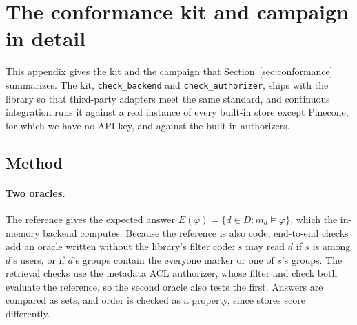 
\section{The conformance kit and campaign in detail}\label{app:conformance}

This appendix gives the kit and the campaign that Section~\ref{sec:conformance} summarizes. The kit,
\texttt{check\_backend} and \texttt{check\_authorizer}, ships with the library so that third-party adapters meet the
same standard, and continuous integration runs it against a real instance of every built-in store except Pinecone,
for which we have no API key, and against the built-in authorizers.

\subsection{Method}\label{sec:conf-method}

\paragraph{Two oracles.}
The reference gives the expected answer $E(\varphi) = \{d \in D : m_d \models \varphi\}$, which the
in-memory backend computes. Because the reference is also code, end-to-end checks add an oracle
written without the library's filter code: $s$ may read $d$ if $s$ is among $d$'s users, or if $d$'s
groups contain the everyone marker or one of $s$'s groups. The retrieval checks use the metadata ACL
authorizer, whose filter and check both evaluate the reference, so the second oracle also tests the
first. Answers are compared as sets, and order is checked as a property, since stores score
differently.

